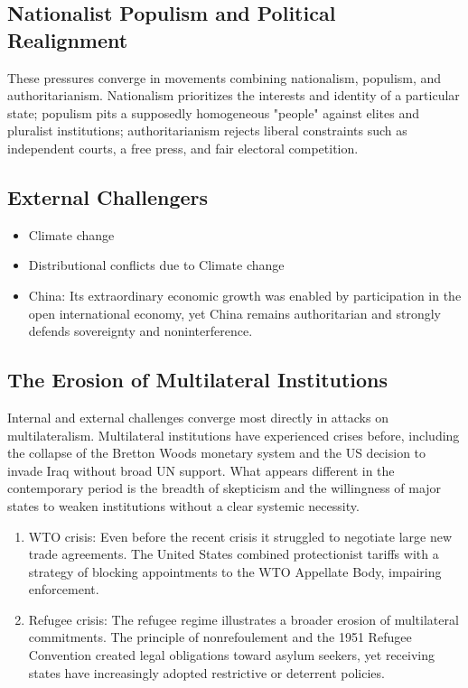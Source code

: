 \subsection{Nationalist Populism and Political Realignment}

These pressures converge in movements combining nationalism, populism, and authoritarianism. Nationalism prioritizes the interests and identity of a particular state; populism pits a supposedly homogeneous "people" against elites and pluralist institutions; authoritarianism rejects liberal constraints such as independent courts, a free press, and fair electoral competition.

\subsection{External Challengers}

\begin{itemize}
    \item Climate change
    \item Distributional conflicts due to Climate change
    \item China: Its extraordinary economic growth was enabled by participation in the open international economy, yet China remains authoritarian and strongly defends sovereignty and noninterference.
\end{itemize}

\subsection{The Erosion of Multilateral Institutions}

Internal and external challenges converge most directly in attacks on multilateralism. Multilateral institutions have experienced crises before, including the collapse of the Bretton Woods monetary system and the US decision to invade Iraq without broad UN support. What appears different in the contemporary period is the breadth of skepticism and the willingness of major states to weaken institutions without a clear systemic necessity.

\begin{enumerate}
    \item WTO crisis: Even before the recent crisis it struggled to negotiate large new trade agreements. The United States combined protectionist tariffs with a strategy of blocking appointments to the WTO Appellate Body, impairing enforcement.
    \item Refugee crisis: The refugee regime illustrates a broader erosion of multilateral commitments. The principle of nonrefoulement and the 1951 Refugee Convention created legal obligations toward asylum seekers, yet receiving states have increasingly adopted restrictive or deterrent policies.
\end{enumerate}

